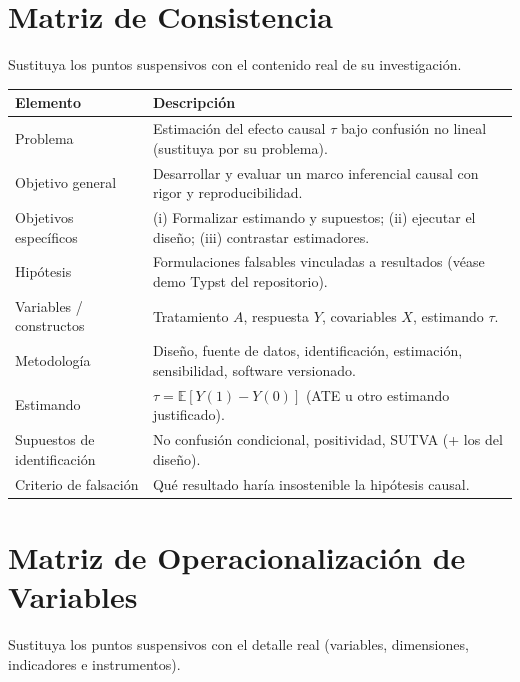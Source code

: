 \documentclass[12pt,a4paper,oneside]{book}
\theoremstyle{plain}
\theoremstyle{definition}
\theoremstyle{remark}
\begin{document}
\begin{appendices}

\chapter{Matriz de Consistencia}
\noindent Sustituya los puntos suspensivos con el contenido real de su investigación.

\begin{longtable}{p{3.4cm} p{11cm}}
\toprule
\textbf{Elemento} & \textbf{Descripción} \\
\midrule
Problema & Estimación del efecto causal $\tau$ bajo confusión no lineal (sustituya por su problema). \\
Objetivo general & Desarrollar y evaluar un marco inferencial causal con rigor y reproducibilidad. \\
Objetivos específicos & (i) Formalizar estimando y supuestos; (ii) ejecutar el diseño; (iii) contrastar estimadores. \\
Hipótesis & Formulaciones falsables vinculadas a resultados (véase demo Typst del repositorio). \\
Variables / constructos & Tratamiento $A$, respuesta $Y$, covariables $X$, estimando $\tau$. \\
Metodología & Diseño, fuente de datos, identificación, estimación, sensibilidad, software versionado. \\
Estimando & $\tau = \mathbb{E}[Y(1) - Y(0)]$ (ATE u otro estimando justificado). \\
Supuestos de identificación & No confusión condicional, positividad, SUTVA (+ los del diseño). \\
Criterio de falsación & Qué resultado haría insostenible la hipótesis causal. \\
\bottomrule
\end{longtable}

\chapter{Matriz de Operacionalización de Variables}
\noindent Sustituya los puntos suspensivos con el detalle real (variables, dimensiones, indicadores e instrumentos).


\end{appendices}
\end{document}
